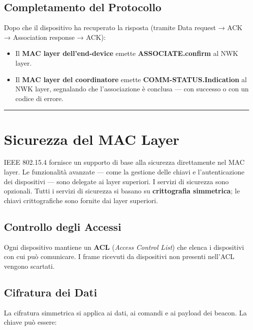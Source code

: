\documentclass[
  italian,
  openany]{book}
\providecommand{\tightlist}{%
  \setlength{\itemsep}{0pt}\setlength{\parskip}{0pt}}
\begin{document}
\subsection{Completamento del
Protocollo}\label{completamento-del-protocollo}

Dopo che il dispositivo ha recuperato la risposta (tramite Data request
→ ACK → Association response → ACK):

\begin{itemize}
\tightlist
\item
  Il \textbf{MAC layer dell'end-device} emette
  \textbf{ASSOCIATE.confirm} al NWK layer.
\item
  Il \textbf{MAC layer del coordinatore} emette
  \textbf{COMM-STATUS.Indication} al NWK layer, segnalando che
  l'associazione è conclusa --- con successo o con un codice di errore.
\end{itemize}

\begin{center}\rule{0.5\linewidth}{0.5pt}\end{center}

\section{Sicurezza del MAC Layer}\label{sicurezza-del-mac-layer}

IEEE 802.15.4 fornisce un supporto di base alla sicurezza direttamente
nel MAC layer. Le funzionalità avanzate --- come la gestione delle
chiavi e l'autenticazione dei dispositivi --- sono delegate ai layer
superiori. I servizi di sicurezza sono opzionali. Tutti i servizi di
sicurezza si basano su \textbf{crittografia simmetrica}; le chiavi
crittografiche sono fornite dai layer superiori.

\subsection{Controllo degli Accessi}\label{controllo-degli-accessi}

Ogni dispositivo mantiene un \textbf{ACL} (\emph{Access Control List})
che elenca i dispositivi con cui può comunicare. I frame ricevuti da
dispositivi non presenti nell'ACL vengono scartati.

\subsection{Cifratura dei Dati}\label{cifratura-dei-dati}

La cifratura simmetrica si applica ai dati, ai comandi e ai payload dei
beacon. La chiave può essere:
\end{document}
